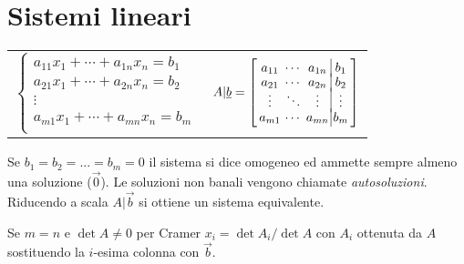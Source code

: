 \section{Sistemi lineari}
\begin{tabular}{@{}l@{}l@{}}
	$\begin{cases}
		a_{11}x_1 + \cdots + a_{1n}x_n = b_1 \\[-0.3em]
		a_{21}x_1 + \cdots + a_{2n}x_n = b_2 \\[-0.3em]
		\vdots \\[-0.3em]
		a_{m1}x_1 + \cdots + a_{mn}x_n = b_m \\
	\end{cases}$ &
	$A|\vec{b} = \left[
		\arraycolsep=1.7pt\def\arraystretch{1.2}
		\begin{array}{ccc|c}
			a_{11} & \cdots & a_{1n} & b_1 \\[-0.3em]
			a_{21} & \cdots & a_{2n} & b_2 \\[-0.3em]
			\vdots & \ddots & \vdots & \vdots \\[-0.3em]
			a_{m1} & \cdots & a_{mn} & b_m \\
		\end{array}
		\right]$
\end{tabular}

Se $b_1 = b_2 = ... = b_m = 0$ il sistema si dice omogeneo ed ammette sempre almeno una soluzione ($\vec{0}$).
Le soluzioni non banali vengono chiamate \emph{autosoluzioni}. Riducendo a scala $A|\vec{b}$ si ottiene un
sistema equivalente.

Se $m = n$ e $\det A \ne 0$ per Cramer $x_i = \det A_i / \det A$ con $A_i$ ottenuta da $A$ sostituendo la $i$-esima
colonna con $\vec{b}$.